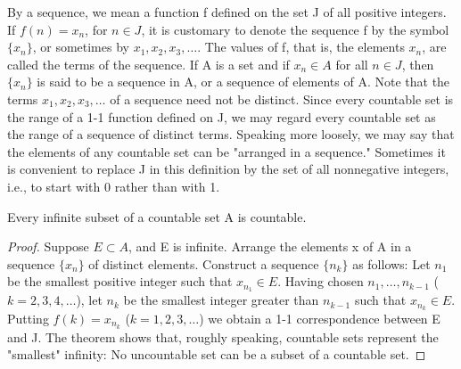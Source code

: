\begin{definition}[Sequence] %
  \label{def:chap2:sequence}
  By a sequence, we mean a function f defined on the set J of all
  positive integers. If $f(n) = x_n$, for $n \in J$, it is customary
  to denote the sequence f by the symbol $\{x_n\}$, or sometimes by
  $x_1, x_2, x_3, \dots$. The values of f, that is, the elements
  $x_n$, are called the terms of the sequence. If A is a set and if
  $x_n \in A$ for all $n \in J$, then $\{x_n\}$ is said to be a
  sequence in A, or a sequence of elements of A.
  Note that the terms $x_1, x_2, x_3, \dots$ of a sequence need not be distinct.
  Since every countable set is the range of a 1-1 function defined on
  J, we may regard every countable set as the range of a sequence of
  distinct terms. Speaking more loosely, we may say that the elements
  of any countable set can be "arranged in a sequence."
  Sometimes it is convenient to replace J in this definition by the
  set of all nonnegative integers, i.e., to start with 0 rather than with 1.
\end{definition}

\begin{theorem} %
  \label{thm:chap2:infinite_subset_countable}
  Every infinite subset of a countable set A is countable.
  \begin{proof}
    Suppose $E \subset A$, and E is infinite. Arrange the elements x
    of A in a sequence $\{x_n\}$ of distinct elements. Construct a
    sequence $\{n_k\}$ as follows:
    Let $n_1$ be the smallest positive integer such that $x_{n_1} \in
    E$. Having chosen $n_1, \dots, n_{k-1}$ ($k=2, 3, 4, \dots$), let
    $n_k$ be the smallest integer greater than $n_{k-1}$ such that
    $x_{n_k} \in E$.
    Putting $f(k) = x_{n_k}$ ($k=1, 2, 3, \dots$) we obtain a 1-1
    correspondence between E and J.
    The theorem shows that, roughly speaking, countable sets
    represent the "smallest" infinity: No uncountable set can be a
    subset of a countable set.
  \end{proof}
\end{theorem}



